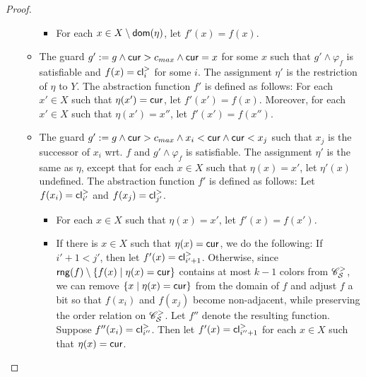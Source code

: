 \begin{appendix}
\begin{proof}
\begin{itemize}
\begin{itemize}
\begin{itemize}
\item For each $x \in X \setminus \mathsf{dom}(\eta)$, let $f'(x)=f(x)$. 
\end{itemize}
%
\item The guard $g' := g \wedge \mathsf{cur} > c_{max} \wedge \mathsf{cur} = x$ for some $x$ such that $g' \wedge \varphi_f$ is satisfiable and $f(x)=\mathsf{cl}^{>}_i$ for some $i$.  The assignment $\eta'$ is the restriction of  $\eta$ to $Y$. The abstraction function $f'$ is defined as follows: For each $x' \in X$ such that $\eta(x')=\mathsf{cur}$, let $f'(x')=f(x)$. Moreover, for each $x' \in X$ such that $\eta(x')=x''$, let $f'(x')=f(x'')$. 
%
\item The guard $g' := g \wedge \mathsf{cur} > c_{max} \wedge  x_i < \mathsf{cur} \wedge \mathsf{cur} < x_j$ such that $x_j$ is the successor of $x_i$ wrt. $f$ and $g' \wedge \varphi_f$ is satisfiable. The assignment $\eta'$ is the same as $\eta$, except that for each $x \in X$ such that $\eta(x)=x'$, let $\eta'(x)$ undefined.  The abstraction function $f'$ is defined as follows: Let $f(x_i)=\mathsf{cl}^{>}_{i'}$ and $f(x_j)=\mathsf{cl}^{>}_{j'}$. 
\begin{itemize}
\item For each $x \in X$ such that $\eta(x)=x'$, let $f'(x)=f(x')$.
%
\item If there is $x \in X$ such that $\eta(x)=\mathsf{cur}$, we do the following: If $i'+1 < j'$, then let $f'(x)= \mathsf{cl}^{>}_{i'+1}$. Otherwise, since $\mathsf{rng}(f) \setminus \{f(x) \mid \eta(x)=\mathsf{cur}\}$ contains at most $k-1$ colors from $\mathscr{C}^>_{\mathcal{S} }$,  we can remove $\{x \mid \eta(x)=\mathsf{cur}\}$ from the domain of $f$ and adjust $f$ a bit so that $f(x_i)$ and $f(x_j)$ become non-adjacent, while preserving the order relation on $\mathscr{C}^>_{\mathcal{S} }$. Let $f''$ denote the resulting function. Suppose $f''(x_i)=\mathsf{cl}^>_{i''}$. Then let $f'(x)=\mathsf{cl}^>_{i''+1}$ for each $x \in X$ such that $\eta(x)=\mathsf{cur}$.


\end{itemize}
\end{itemize}
\end{itemize}
\end{proof}
\end{appendix}
